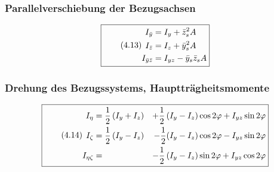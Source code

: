 \documentclass[11pt]{article}
\newcommand{\1}{ {\mathds{1}} }
\begin{document}
%
%
%

		\subsubsection{Parallelverschiebung der Bezugsachsen}

		\begin{equation}
			\boxed{
				\tag{4.13}
				\begin{split}
					I_{\bar{y}} &= I_y + \bar{z}^2_s A\\
					I_{\bar{z}} &= I_z + \bar{y}^2_s A\\
					I_{\bar{y} \bar{z}} &= I_{yz} - \bar{y}_{s} \bar{z}_{s} A
				\end{split}
			}
		\end{equation}

		\subsubsection{Drehung des Bezugssystems, Hauptträgheitsmomente}

		\begin{equation}
			\boxed{
				\tag{4.14}
				\begin{split}
					I_{\eta} &= \frac{1}{2}\left( I_y + I_z \right) &+ \frac{1}{2}\left( I_y - I_z \right)\cos{2\varphi} + I_{yz} \sin{2\varphi}\\
					I_{\zeta} &= \frac{1}{2}\left( I_y - I_z \right)&-\frac{1}{2}(I_y-I_z)\cos{2\varphi} -I_{yz}\sin{2\varphi}\\
					I_{\eta \zeta} &=  &-\frac{1}{2}\left( I_y - I_z \right)\sin{2\varphi} + I_{yz}\cos{2\varphi}
				\end{split}
			}
		\end{equation}
\end{document}
